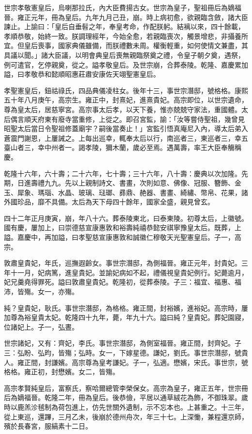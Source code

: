 \begin{pinyinscope}
世宗孝敬憲皇后，烏喇那拉氏，內大臣費揚古女。世宗為皇子，聖祖冊后為嫡福晉。雍正元年，冊為皇后。九年九月己丑，崩。時上病初愈，欲親臨含斂，諸大臣諫止。上諭曰：「皇后自垂髫之年，奉皇考命，作配朕躬。結褵以來，四十餘載，孝順恭敬，始終一致。朕調理經年，今始全愈，若親臨喪次，觸景增悲，非攝養所宜。但皇后喪事，國家典儀雖備，而朕禮數未周。權衡輕重，如何使情文兼盡，其具議以聞。」諸大臣議，以明會典皇后喪無親臨祭奠之禮，令皇子朝夕奠，遇祭，例可遣官，乞停親奠，從之。謚孝敬皇后。及世宗崩，合葬泰陵。乾隆、嘉慶累加謚，曰孝敬恭和懿順昭惠莊肅安康佐天翊聖憲皇后。

孝聖憲皇后，鈕祜祿氏，四品典儀凌柱女。後年十三，事世宗潛邸，號格格。康熙五十年八月庚午，高宗生。雍正中，封熹妃，進熹貴妃。高宗即位，以世宗遺命，尊為皇太后，居慈寧宮。高宗事太后孝，以天下養，惟亦兢兢守家法，重國體。太后偶言順天府東有廢寺當重修，上從之。即召宮監，諭：「汝等嘗侍聖祖，幾曾見昭聖太后當日令聖祖修蓋廟宇？嗣後當奏止！」宮監引悟真庵尼入內，導太后弟入蒼震門謝恩，上屢誡之。上每出巡幸，輒奉太后以行，南巡者三，東巡者三，幸五臺山者三，幸中州者一。謁孝陵，獮木蘭，歲必至焉。遇萬壽，率王大臣奉觴稱慶。

乾隆十六年，六十壽；二十六年，七十壽；三十六年，八十壽：慶典以次加隆。先期，日進壽禮九九。先以上親制詩文、書畫，次則如意、佛像、冠服、簪飾、金玉、犀象、瑪瑙、水晶、玻璃、琺瑯、彞鼎、赩器、書畫、綺繡、幣帛、花果，諸外國珍品，靡不具備。太后為天下母四十餘年，國家全盛，親見曾玄。

四十二年正月庚寅，崩，年八十六。葬泰陵東北，曰泰東陵。初尊太后，上徽號。國有慶，屢加上，曰崇德慈宣康惠敦和裕壽純禧恭懿安祺寧豫皇太后。既葬，上謚。嘉慶中，再加謚，曰孝聖慈宣康惠敦和誠徽仁穆敬天光聖憲皇后。子一，高宗。

敦肅皇貴妃，年氏，巡撫遐齡女。事世宗潛邸，為側福晉。雍正元年，封貴妃。三年十一月，妃病篤，進皇貴妃。並諭妃病如不起，禮儀視皇貴妃例行。妃薨逾月，妃兄羹堯得罪死。謚曰敦肅皇貴妃。乾隆初，從葬泰陵。子三：福宜、福惠、福沛，皆殤。女一，亦殤。

純？皇貴妃，耿氏。事世宗潛邸，為格格。雍正間，封裕嬪，進裕妃。高宗時，屢加尊為裕皇貴太妃。乾隆四十九年，薨，年九十六。謚曰純？皇貴妃。葬妃園寢，位諸妃上。子一，弘晝。

世宗諸妃，又有：齊妃，李氏。事世宗潛邸，為側室福晉。雍正間，封齊妃。子三：弘盼、弘昀，皆殤；弘時。女一，下嫁星德。謙妃，劉氏。事世宗潛邸，號貴人。雍正間，封謙嬪。高宗尊為皇考謙妃。子一，弘適。懋嬪，宋氏。事世宗，號格格。雍正初，封懋嬪。女二，皆殤。

高宗孝賢純皇后，富察氏，察哈爾總管李榮保女。高宗為皇子，雍正五年，世宗冊后為嫡福晉。乾隆二年，冊為皇后。後恭儉，平居以通草絨花為飾，不御珠翠。歲時以鹿羔沴毧制為荷包進上，仿先世關外遺制，示不忘本也。上甚重之。十三年，從上東巡，還蹕，三月乙未，後崩於德州舟次，年三十七。上深慟，兼程還京師，殯於長春宮，服縞素十二日。


\end{pinyinscope}
